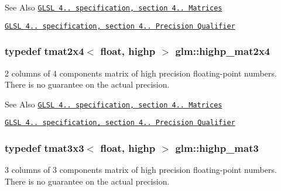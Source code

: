 \begin{DoxySeeAlso}{See Also}
\href{http://www.opengl.org/registry/doc/GLSLangSpec.4.20.8.pdf}{\tt G\-L\-S\-L 4.. specification, section 4.. Matrices} 

\href{http://www.opengl.org/registry/doc/GLSLangSpec.4.20.8.pdf}{\tt G\-L\-S\-L 4.. specification, section 4.. Precision Qualifier} 
\end{DoxySeeAlso}
\hypertarget{group__core__precision_ga74ae75c71c8c2b775714fb24454d6096}{
\subsubsection[{highp\-\_\-mat2x4}]{\setlength{\rightskip}{0pt plus 5cm}typedef tmat2x4$<$ float, highp $>$ {\bf glm\-::highp\-\_\-mat2x4}}}\label{group__core__precision_ga74ae75c71c8c2b775714fb24454d6096}
2 columns of 4 components matrix of high precision floating-\/point numbers. There is no guarantee on the actual precision.

\begin{DoxySeeAlso}{See Also}
\href{http://www.opengl.org/registry/doc/GLSLangSpec.4.20.8.pdf}{\tt G\-L\-S\-L 4.. specification, section 4.. Matrices} 

\href{http://www.opengl.org/registry/doc/GLSLangSpec.4.20.8.pdf}{\tt G\-L\-S\-L 4.. specification, section 4.. Precision Qualifier} 
\end{DoxySeeAlso}
\hypertarget{group__core__precision_ga5822a3dc6f6d421ee0b6a3c7f41a3ff1}{
\subsubsection[{highp\-\_\-mat3}]{\setlength{\rightskip}{0pt plus 5cm}typedef tmat3x3$<$ float, highp $>$ {\bf glm\-::highp\-\_\-mat3}}}\label{group__core__precision_ga5822a3dc6f6d421ee0b6a3c7f41a3ff1}
3 columns of 3 components matrix of high precision floating-\/point numbers. There is no guarantee on the actual precision.

